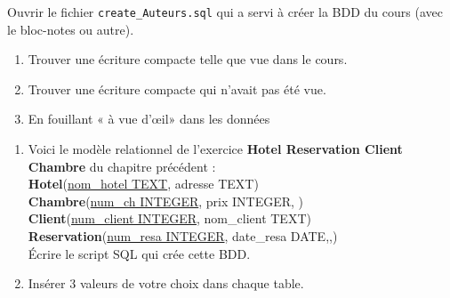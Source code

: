 \begin{exercice}[]
    Ouvrir le fichier \texttt{create\_Auteurs.sql} qui a servi à créer la BDD du cours (avec le bloc-notes ou autre).
    \begin{enumerate}
        \item 	Trouver une écriture compacte telle que vue dans le cours.
        \item 	Trouver une écriture compacte qui n'avait pas été vue.
        \item 	En fouillant « à vue d'\oe il» dans les données
    \end{enumerate}
\end{exercice}
\begin{exercice}[]
    \begin{enumerate}
        \item Voici le modèle relationnel de l'exercice \textbf{Hotel Reservation Client Chambre} du chapitre précédent :\\
              
              \textbf{Hotel}(\uline{nom\_hotel TEXT}, adresse TEXT)\\
              
              \textbf{Chambre}(\uline{num\_ch INTEGER}, prix INTEGER, )\\
              
              \textbf{Client}(\uline{num\_client INTEGER}, nom\_client TEXT)\\
              
              
              \textbf{Reservation}(\uline{num\_resa INTEGER}, date\_resa DATE,,)\\
              
              Écrire le script SQL qui crée cette BDD.
        \item Insérer 3 valeurs de votre choix dans chaque table.
    \end{enumerate}
\end{exercice}

